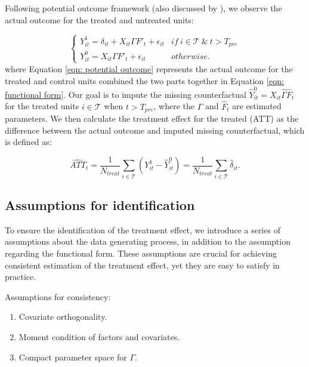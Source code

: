 \documentclass[12pt]{article}
\begin{document}
Following \cite{splawa1990application} potential outcome framework (also discussed by \cite{rubin1974estimating, rubin2005causal}), we observe the actual outcome for the treated and untreated units:

\begin{equation}
\label{eqn: potential outcome}
\begin{cases}
      Y_{it}^1 = \delta_{it} + X_{it} \Gamma F'_t + \epsilon_{it} & if \ i \in \mathcal{T} \ \& \ t > T_{pre} \\
      Y_{it}^0 = X_{it} \Gamma F'_t + \epsilon_{it} & otherwise.
\end{cases}
\end{equation}
where Equation \ref{eqn: potential outcome} represents the actual outcome for the treated and control units combined the two parts together in Equation \ref{eqn: functional form}. Our goal is to impute the missing counterfactual $\hat{Y}_{it}^0 = X_{it} \hat{\Gamma} \hat{F}_t$ for the treated units $i \in \mathcal{T}$ when $t > T_{pre}$, where the $\hat{\Gamma}$ and $\hat{F}_t$ are estimated parameters. We then calculate the treatment effect for the treated (ATT) as the difference between the actual outcome and imputed missing counterfactual, which is defined as:

\begin{equation}
\widehat{ATT}_{t} = \frac{1}{N_{treat}}\sum_{i \in \mathcal{T}} \left( Y_{it}^1 - \hat{Y}_{it}^0 \right) = \frac{1}{N_{treat}}\sum_{i \in \mathcal{T}}\hat{\delta}_{it}.
\end{equation}
\subsection{Assumptions for identification}

To ensure the identification of the treatment effect, we introduce a series of assumptions about the data generating process, in addition to the assumption regarding the functional form. These assumptions are crucial for achieving consistent estimation of the treatment effect, yet they are easy to satisfy in practice.

\begin{assumption}
\label{ass: consistency}
Assumptions for consistency:
\begin{enumerate}
\item Covariate orthogonality.
\item Moment condition of factors and covariates.
\item Compact parameter space for $\Gamma$. 
\end{enumerate}
\end{assumption}
\end{document}
